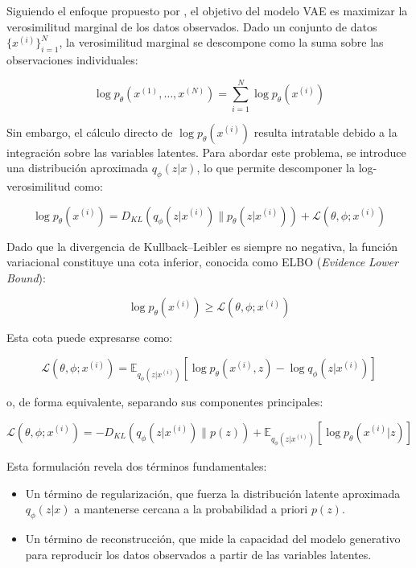 Siguiendo el enfoque propuesto por \cite{kingma2013auto}, el objetivo del modelo VAE es maximizar la verosimilitud marginal de los datos observados. Dado un conjunto de datos $\{x^{(i)}\}_{i=1}^{N}$, la verosimilitud marginal se descompone como la suma sobre las observaciones individuales:

\begin{equation}
\log p_{\theta}(x^{(1)}, \ldots, x^{(N)})
=
\sum_{i=1}^{N} \log p_{\theta}(x^{(i)})
\end{equation}

Sin embargo, el cálculo directo de $\log p_{\theta}(x^{(i)})$ resulta intratable debido a la integración sobre las variables latentes. Para abordar este problema, se introduce una distribución aproximada $q_{\phi}(z|x)$, lo que permite descomponer la log-verosimilitud como:

\begin{equation}
\log p_{\theta}(x^{(i)})
=
D_{KL}
\left(
q_{\phi}(z|x^{(i)})
\parallel
p_{\theta}(z|x^{(i)})
\right)
+
\mathcal{L}(\theta,\phi;x^{(i)})
\end{equation}

Dado que la divergencia de Kullback--Leibler es siempre no negativa, la función variacional constituye una cota inferior, conocida como ELBO (\textit{Evidence Lower Bound}):

\begin{equation}
\log p_{\theta}(x^{(i)})
\geq
\mathcal{L}(\theta,\phi;x^{(i)})
\end{equation}

Esta cota puede expresarse como:

\begin{equation}
\mathcal{L}(\theta,\phi;x^{(i)})
=
\mathbb{E}_{q_{\phi}(z|x^{(i)})}
\left[
\log p_{\theta}(x^{(i)},z)
-
\log q_{\phi}(z|x^{(i)})
\right]
\end{equation}

o, de forma equivalente, separando sus componentes principales:

\begin{equation}
\mathcal{L}(\theta,\phi;x^{(i)})
=
-D_{KL}
\left(
q_{\phi}(z|x^{(i)})
\parallel
p(z)
\right)
+
\mathbb{E}_{q_{\phi}(z|x^{(i)})}
\left[
\log p_{\theta}(x^{(i)}|z)
\right]
\end{equation}

Esta formulación revela dos términos fundamentales:

\begin{itemize}
\item Un término de regularización, que fuerza la distribución latente aproximada $q_{\phi}(z|x)$ a mantenerse cercana a la probabilidad a priori $p(z)$.
\item Un término de reconstrucción, que mide la capacidad del modelo generativo para reproducir los datos observados a partir de las variables latentes.
\end{itemize}

